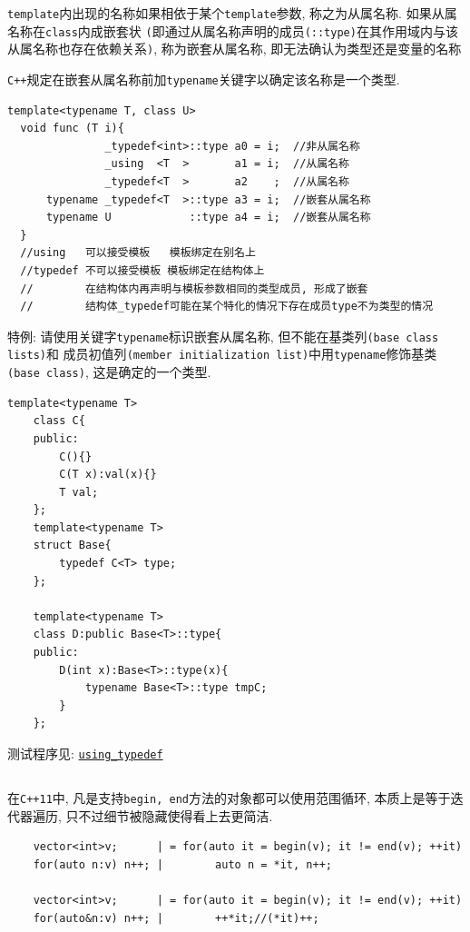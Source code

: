 {\tt template}内出现的名称如果相依于某个{\tt template}参数, 称之为从属名称. 如果从属名称在{\tt class}内成嵌套状
	{\tt (}即通过从属名称声明的成员{\tt (::type)}在其作用域内与该从属名称也存在依赖关系{\tt )}, 
	称为嵌套从属名称, 即无法确认为类型还是变量的名称

{\tt C++}规定在嵌套从属名称前加{\tt typename}关键字以确定该名称是一个类型.
\begin{lstlisting}[xleftmargin=2em,xrightmargin=2em]
  template<typename T, class U> 
  void func (T i){
		       _typedef<int>::type a0 = i;  //非从属名称
			   _using  <T  >       a1 = i;  //从属名称
		       _typedef<T  >       a2    ;  //从属名称
	  typename _typedef<T  >::type a3 = i;  //嵌套从属名称
      typename U            ::type a4 = i;  //嵌套从属名称
  }
  //using   可以接受模板   模板绑定在别名上
  //typedef 不可以接受模板 模板绑定在结构体上
  //		在结构体内再声明与模板参数相同的类型成员, 形成了嵌套
  //	    结构体_typedef可能在某个特化的情况下存在成员type不为类型的情况
\end{lstlisting}

特例: 请使用关键字{\tt typename}标识嵌套从属名称, 但不能在基类列{\tt (base class lists)}和
	成员初值列{\tt (member initialization list)}中用{\tt typename}修饰基类{\tt (base class)}, 
	这是确定的一个类型.

\begin{lstlisting}[xleftmargin=2em,xrightmargin=2em]
	template<typename T>
	class C{
	public:
		C(){}
		C(T x):val(x){}
		T val;
	};
	template<typename T>
	struct Base{
		typedef C<T> type;
	};

	template<typename T>
	class D:public Base<T>::type{
	public:
		D(int x):Base<T>::type(x){
			typename Base<T>::type tmpC;
		}
	};
\end{lstlisting}

测试程序见: \href{https://github.com/wenqingqian/Obtuse/blob/main/test/cpp/c++11/using_typedef.cpp}{\tt using\_typedef}
\subsection{\color{purple}{范围循环}}
在{\tt C++11}中, 凡是支持{\tt begin, end}方法的对象都可以使用范围循环, 本质上是等于迭代器遍历, 
	只不过细节被隐藏使得看上去更简洁.
\begin{lstlisting}
	vector<int>v;      | = for(auto it = begin(v); it != end(v); ++it)
	for(auto n:v) n++; |		auto n = *it, n++;
		
	vector<int>v;      | = for(auto it = begin(v); it != end(v); ++it)
	for(auto&n:v) n++; |		++*it;//(*it)++;
\end{lstlisting}
